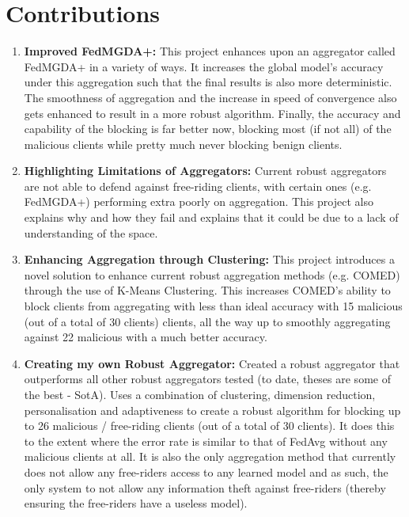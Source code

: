 \section{Contributions}
\begin{enumerate}
    \item \textbf{Improved FedMGDA+:} 
    This project enhances upon an aggregator called FedMGDA+ in a variety of ways.
    It increases the global model's accuracy under this aggregation such that the final results is also more deterministic.
    The smoothness of aggregation and the increase in speed of convergence also gets enhanced to result in a more robust algorithm.
    Finally, the accuracy and capability of the blocking is far better now, blocking most (if not all) of the malicious clients while pretty much never blocking benign clients.
    
    \item \textbf{Highlighting Limitations of Aggregators:}
    Current robust aggregators are not able to defend against free-riding clients, with certain ones (e.g. FedMGDA+) performing extra poorly on aggregation.
    This project also explains why and how they fail and explains that it could be due to a lack of understanding of the space.
    
    \item \textbf{Enhancing Aggregation through Clustering:}
    This project introduces a novel solution to enhance current robust aggregation methods (e.g. COMED) through the use of K-Means Clustering.
    This increases COMED's ability to block clients from aggregating with less than ideal accuracy with 15 malicious (out of a total of 30 clients) clients, all the way up to smoothly aggregating against 22 malicious with a much better accuracy.
    
    \item \textbf{Creating my own Robust Aggregator:}
    Created a robust aggregator that outperforms all other robust aggregators tested (to date, theses are some of the best - SotA).
    Uses a combination of clustering, dimension reduction, personalisation and adaptiveness to create a robust algorithm for blocking up to 26 malicious / free-riding clients (out of a total of 30 clients).
    It does this to the extent where the error rate is similar to that of FedAvg without any malicious clients at all.
    It is also the only aggregation method that currently does not allow any free-riders access to any learned model and as such, the only system to not allow any information theft against free-riders (thereby ensuring the free-riders have a useless model).
    

\end{enumerate}
